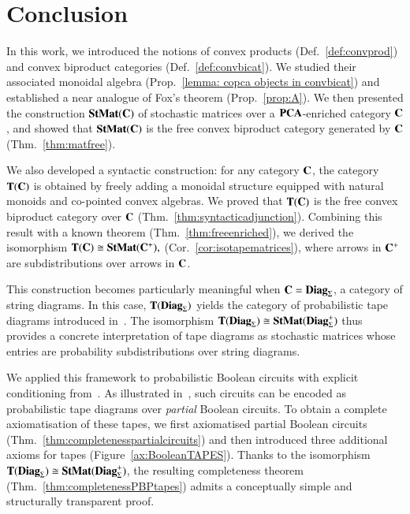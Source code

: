 

\section{Conclusion}\label{sec:conclusion} %


In this work, we introduced the notions of convex products (Def.~\ref{def:convprod}) and convex biproduct categories (Def.~\ref{def:convbicat}). We studied their associated monoidal algebra (Prop.~\ref{lemma: copca objects in convbicat}) and established a near analogue of Fox's theorem (Prop.~\ref{prop:A}). We then presented the construction $\mathbf{StMat}(\mathbf{C})$ of stochastic matrices over a $\mathbf{PCA}$-enriched category $\mathbf{C}$, and showed that $\mathbf{StMat}(\mathbf{C})$ is the free convex biproduct category generated by $\mathbf{C}$ (Thm.~\ref{thm:matfree}).

We also developed a syntactic construction: for any category $\mathbf{C}$, the category $\mathbf{T}(\mathbf{C})$ is obtained by freely adding a monoidal structure equipped with natural monoids and co-pointed convex algebras. We proved that $\mathbf{T}(\mathbf{C})$ is the free convex biproduct category over $\mathbf{C}$ (Thm.~\ref{thm:syntacticadjunction}). Combining this result with a known theorem (Thm.~\ref{thm:freeenriched}), we derived the isomorphism
$\mathbf{T}(\mathbf{C}) \cong \mathbf{StMat}(\mathbf{C}^+),$
(Cor.~\ref{cor:isotapematrices}), where arrows in $\mathbf{C}^+$ are subdistributions over arrows in $\mathbf{C}$.

This construction becomes particularly meaningful when $\mathbf{C} = \mathbf{Diag}_{\Sigma}$, a category of string diagrams. In this case, $\mathbf{T}(\mathbf{Diag}_{\Sigma})$ yields the category of probabilistic tape diagrams introduced in~\cite{bonchi2025tapediagramsmonoidalmonads}. The isomorphism
$
\mathbf{T}(\mathbf{Diag}_{\Sigma}) \cong \mathbf{StMat}(\mathbf{Diag}_{\Sigma}^+)
$
thus provides a concrete interpretation of tape diagrams as stochastic matrices whose entries are probability subdistributions over string diagrams.

We applied this framework to probabilistic Boolean circuits with explicit conditioning from~\cite{piedeleu2025boolean}. As illustrated in~\cite[Ex.~30]{bonchi2025tapediagramsmonoidalmonads}, such circuits can be encoded as probabilistic tape diagrams over \emph{partial} Boolean circuits. To obtain a complete axiomatisation of these tapes, we first axiomatised partial Boolean circuits (Thm.~\ref{thm:completenesspartialcircuits}) and then introduced three additional axioms for tapes (Figure~\ref{ax:BooleanTAPES}). Thanks to the isomorphism
$\mathbf{T}(\mathbf{Diag}_{\Sigma}) \cong \mathbf{StMat}(\mathbf{Diag}_{\Sigma}^+)$, the resulting completeness theorem (Thm.~\ref{thm:completenessPBPtapes}) admits a conceptually simple and structurally transparent proof.

